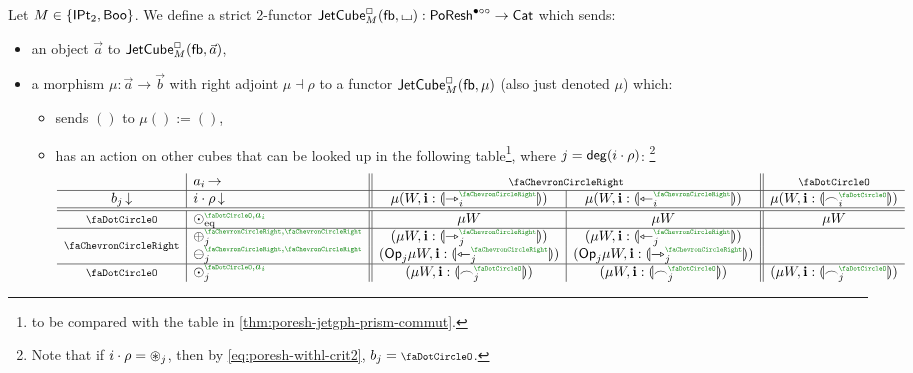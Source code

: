 \documentclass[a4paper]{memoir}
\begin{document}
\begin{definition}
	Let $M \in \mathopen{}\left\{ {\mathsf{IPt}_2}, \mathsf{Boo} \right\}\mathclose{}$.
	We define a strict 2-functor $\mathsf{JetCube}^{\Box}_{M}({\mathsf{fb}},{\llcorner\hspace{-.4ex}\lrcorner}) : \mathsf{PoResh}^{\bullet \circ \circ} \to {\mathsf{Cat}}$ which sends:
	\begin{itemize}
		\item an object $\vec a$ to $\mathsf{JetCube}^{\Box}_{M}({\mathsf{fb}},\vec a)$,
		\item a morphism $\mu : \vec a \to \vec b$ with right adjoint $\mu \dashv \rho$ to a functor $\mathsf{JetCube}^{\Box}_{M}({\mathsf{fb}},\mu)$ (also just denoted $\mu$) which:
		\begin{itemize}
			\item sends $()$ to $\mu () := ()$,
			\item has an action on other cubes that can be looked up in the following table\footnote{to be compared with the table in \cref{thm:poresh-jetgph-prism-commut}.}, where $j = \mathsf{deg}(i \cdot \rho)$:%
			\footnote{Note that if $i \cdot \rho = {\oast}_j$, then by \cref{eq:poresh-withl-crit2}, $b_j = \npolar$.}
			\[
				\begin{array}{c | l || c | c || c}
					& a_i\,{\rightarrow} & \multicolumn{2}{c ||}{\ypolar} & \npolar \\ \hline
					{b_j}\,{\downarrow}
					& {i \cdot \rho}\,{\downarrow}
					& \mu(W, \dm i : \rival{\jetsym_i\pmry})
					& \mu(W, \dm i : \rival{\tejsym_i\pmry})
					& \mu(W, \dm i : \rival{\edgesym_i\pmrn})
					\\ \hline \hline
					\npolar
					& \nonpol_\eqtydeg\pmrhom{\npolar}{a_i}
					& \mu W
					& \mu W
					& \mu W
					\\ \hline
					\multirow{2}{*}{$\ypolar$}
					& \pospol_j\pmrhom{\ypolar}{\ypolar}
					& (\mu W, \dm i : \rival{\jetsym_j\pmry})
					& (\mu W, \dm i : \rival{\tejsym_j\pmry})
					&
					\\
					& \negpol_j\pmrhom{\ypolar}{\ypolar}
					& (\Op_j\mu W, \dm i : \rival{\tejsym_j\pmry})
					& (\Op_j\mu W, \dm i : \rival{\jetsym_j\pmry})
					&
					\\ \hline
					\npolar
					& \nonpol_j\pmrhom{\npolar}{a_i}
					& (\mu W, \dm i : \rival{\edgesym_j\pmrn})
					& (\mu W, \dm i : \rival{\edgesym_j\pmrn})
					& (\mu W, \dm i : \rival{\edgesym_j\pmrn})

\end{array}\]
\end{itemize}
\end{itemize}
\end{definition}
\end{document}
